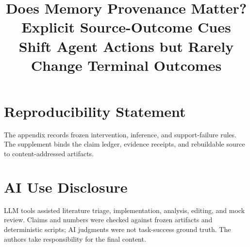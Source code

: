 \documentclass{article}
\title{Does Memory Provenance Matter? Explicit Source-Outcome Cues Shift Agent Actions but Rarely Change Terminal Outcomes}
\begin{document}
\maketitle









\section*{Reproducibility Statement}
The appendix records frozen intervention, inference, and support-failure rules. The supplement binds the claim ledger, evidence receipts, and rebuildable source to content-addressed artifacts.

\section*{AI Use Disclosure}
LLM tools assisted literature triage, implementation, analysis, editing, and mock review. Claims and numbers were checked against frozen artifacts and deterministic scripts; AI judgments were not task-success ground truth. The authors take responsibility for the final content.



\appendix

\end{document}
